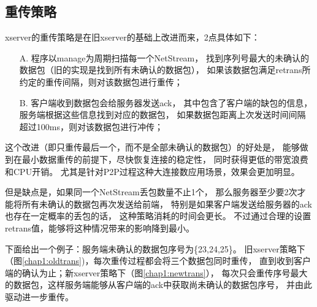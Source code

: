\subsection{重传策略}

xserver的重传策略是在旧xserver的基础上改进而来，2点具体如下：
\begin{itemize}
    \item [A.] 程序以manage为周期扫描每一个NetStream，
        找到序列号最大的未确认的数据包（旧的实现是找到所有未确认的数据包），
        如果该数据包满足retrans所约定的重传间隔，则对该数据包进行重传；
    \item [B.] 客户端收到数据包会给服务器发送ack，
        其中包含了客户端的缺包的信息，服务端根据这些信息找到对应的数据包，
        如果数据包距离上次发送时间间隔超过100ms，则对该数据包进行冲传；
\end{itemize}

这个改进（即只重传最后一个，而不是全部未确认的数据包）的好处是，
能够做到在最小数据重传的前提下，尽快恢复连接的稳定性，
同时获得更低的带宽浪费和CPU开销。
尤其是针对P2P过程这种大连接数应用场景，效果会更加明显。

但是缺点是，如果同一个NetStream丢包数量不止1个，
那么服务器至少要2次才能将所有未确认的数据包再次发送给前端，
特别是如果客户端发送给服务器的ack也存在一定概率的丢包的话，
这种策略消耗的时间会更长。
不过通过合理的设置retrans值，能够将这种情况带来的影响降到最小。

下面给出一个例子：服务端未确认的数据包序号为\{23,24,25\}。
旧xserver策略下（图\ref{chap1:oldtrans})，每次重传过程都会将三个数据包同时重传，
直到收到客户端的确认为止；新xserver策略下（图\ref{chap1:newtrans}），
每次只会重传序号最大的数据包，这样服务端能够从客户端的ack中获取尚未确认的数据包序号，
并由此驱动进一步重传。

